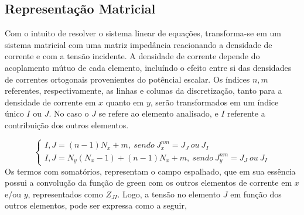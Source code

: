 \documentclass[
	12pt,				%
	openright,			%
	oneside,			%
	a4papey79r,			%
	english,			%
	brazil				%
	]{abntex2}
\begin{document}
\subsection{Representação Matricial}
Com o intuito de resolver o sistema linear de equações, transforma-se em um sistema matricial com uma matriz impedância reacionando a densidade de corrente e com a tensão incidente. A densidade de corrente depende  do acoplamento mútuo de cada elemento, incluíndo o efeito entre si das densidades de correntes ortogonais provenientes do potêncial escalar. Os índices $n,m$ referentes, respectivamente, as linhas e colunas da discretização, tanto para a densidade de corrente em $x$ quanto em $y$, serão transformados em um índice único $I$ ou $J$.  No caso o $J$ se refere ao elemento analisado, e $I$ referente a contribuição dos outros elementos.

\begin{equation}
\begin{cases}
I,J=(n-1) N_x+m ,\ sendo \ J_x^{nm}=J_{J} \ ou \ J_{I}\\
I,J=N_y(N_x-1)+(n-1) N_x+m ,\ sendo \ J_y^{nm}=J_{J} \ ou \ J_{I}
\end{cases}
 
\end{equation}
Os termos com somatórios, representam o campo espalhado, que em sua essência possui a convolução da função de green com os outros elementos de corrente em $x$ e/ou $y$,  representados como $Z_{JI}$. Logo, a tensão no elemento $J$ em função dos outros elementos, pode ser expressa como a seguir,
\end{document}
